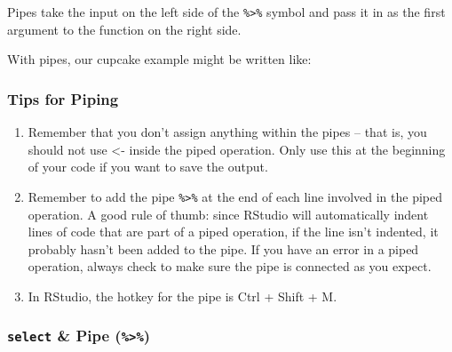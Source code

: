 \documentclass[]{book}
\newenvironment{Shaded}{\begin{snugshade}}{\end{snugshade}}
\newcommand{\CommentTok}[1]{\textcolor[rgb]{0.56,0.35,0.01}{\textit{#1}}}
\newcommand{\KeywordTok}[1]{\textcolor[rgb]{0.13,0.29,0.53}{\textbf{#1}}}
\newcommand{\NormalTok}[1]{#1}
\newcommand{\OperatorTok}[1]{\textcolor[rgb]{0.81,0.36,0.00}{\textbf{#1}}}
\newcommand{\StringTok}[1]{\textcolor[rgb]{0.31,0.60,0.02}{#1}}
\begin{document}
Pipes take the input on the left side of the \texttt{\%\textgreater{}\%} symbol and pass it in as the first argument to the function on the right side.

With pipes, our cupcake example might be written like:

\begin{Shaded}
\end{Shaded}

\hypertarget{tips-for-piping}{%
\subsubsection*{Tips for Piping}\label{tips-for-piping}}

\begin{enumerate}
\def\labelenumi{\arabic{enumi}.}
\item
  Remember that you don't assign anything within the pipes -- that is, you should not use \textless{}- inside the piped operation. Only use this at the beginning of your code if you want to save the output.
\item
  Remember to add the pipe \texttt{\%\textgreater{}\%} at the end of each line involved in the piped operation. A good rule of thumb: since RStudio will automatically indent lines of code that are part of a piped operation, if the line isn't indented, it probably hasn't been added to the pipe. If you have an error in a piped operation, always check to make sure the pipe is connected as you expect.
\item
  In RStudio, the hotkey for the pipe is Ctrl + Shift + M.
\end{enumerate}

\hypertarget{select-pipe}{%
\subsubsection*{\texorpdfstring{\texttt{select} \& Pipe (\texttt{\%\textgreater{}\%})}{select \& Pipe (\%\textgreater{}\%)}}\label{select-pipe}}
\end{document}
